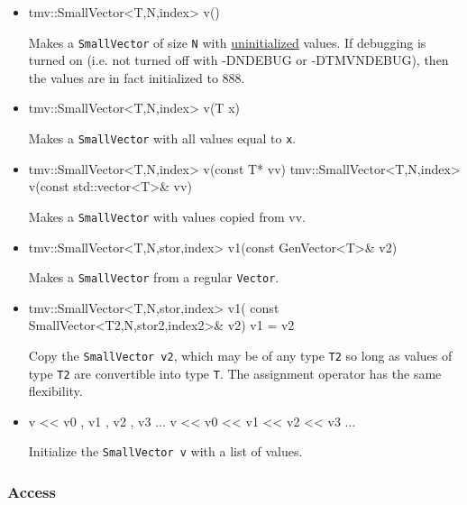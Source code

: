 \documentclass[twoside,letterpaper,11pt]{article}
\renewcommand{\tt}[1]{{\lstinline {#1}}}
\begin{document}
\begin{itemize}
\item 
\begin{tmvcode}
tmv::SmallVector<T,N,index> v()
\end{tmvcode}
Makes a \tt{SmallVector} of size \tt{N}
with \underline{uninitialized} values.
If debugging is turned on (i.e. not turned off
with -DNDEBUG or -DTMVNDEBUG), then the values are in fact initialized to 888. 

\item
\begin{tmvcode}
tmv::SmallVector<T,N,index> v(T x)
\end{tmvcode}
Makes a \tt{SmallVector} with all values equal to \tt{x}.

\item
\begin{tmvcode}
tmv::SmallVector<T,N,index> v(const T* vv)
tmv::SmallVector<T,N,index> v(const std::vector<T>& vv)
\end{tmvcode}
Makes a \tt{SmallVector} with values copied from vv.

\item 
\begin{tmvcode}
tmv::SmallVector<T,N,stor,index> v1(const GenVector<T>& v2)
\end{tmvcode}
Makes a \tt{SmallVector} from a regular \tt{Vector}.

\item
\begin{tmvcode}
tmv::SmallVector<T,N,stor,index> v1(
      const SmallVector<T2,N,stor2,index2>& v2)
v1 = v2
\end{tmvcode}
Copy the \tt{SmallVector v2}, which may be of any type \tt{T2} so long
as values of type \tt{T2} are convertible into type \tt{T}.
The assignment operator has the same flexibility.

\item
\begin{tmvcode}
v << v0 , v1 , v2 , v3 ...
v << v0 << v1 << v2 << v3 ...
\end{tmvcode}
Initialize the \tt{SmallVector v} with a list of values.

\end{itemize}

\subsubsection{Access}
\label{SmallVector_Access}
\end{document}
